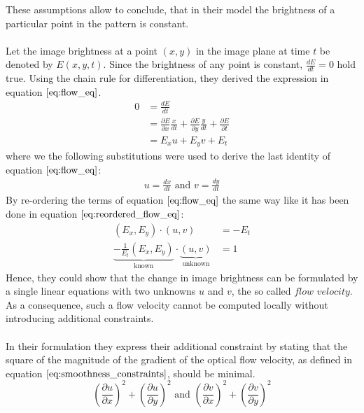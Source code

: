 These assumptions allow to conclude, that in their model the brightness of a particular point in the pattern is constant. \\ \\
Let the image brightness at a point $(x,y)$ in the image plane at time $t$ be denoted by $E(x,y,t)$. Since the brightness of any point is constant, $\frac{d E}{dt} = 0$ hold true. Using the chain rule for differentiation, they derived the expression in equation $\ref{eq:flow_eq}$.  
\begin{equation}
\begin{aligned}
0 &= \frac{d E}{dt} \\
&= \frac{\partial E}{\partial x} \frac{x}{dt} + \frac{\partial E}{\partial y} \frac{y}{dt} + \frac{\partial E}{\partial t} \\
&= E_{x} u + E_{y} v + E_{t}
\end{aligned}
\label{eq:flow_eq}	
\end{equation}
where we the following substitutions were used to derive the last identity of equation $\ref{eq:flow_eq}$:
\begin{equation}
\begin{aligned}
	u = \frac{dx}{dt} \text{ and } v = \frac{dy}{dt}
\end{aligned}
\end{equation}
By re-ordering the terms of equation $\ref{eq:flow_eq}$ the same way like it has been done in equation $\ref{eq:reordered_flow_eq}$:
\begin{equation}
\begin{aligned}
	(E_x, E_y) \cdot (u, v) &= -E_t \\
	\underbrace{-\frac{1}{E_t}\left( E_x, E_y \right)}_\text{known} \cdot \underbrace{(u, v)}_\text{unknown} &= 1
\end{aligned}
\label{eq:reordered_flow_eq}
\end{equation}
Hence, they could show that the change in image brightness can be formulated by a single linear equations with two unknowns $u$ and $v$, the so called $\textit{flow velocity}$. As a consequence, such a flow velocity cannot be computed locally without introducing additional constraints. \\ \\
In their formulation they express their additional constraint by stating that the square of the magnitude of the gradient of the optical flow velocity, as defined in equation $\ref{eq:smoothness_constraints}$, should be minimal.
\begin{equation}
	\left( \frac{\partial u}{\partial x} \right)^2 + \left( \frac{\partial u}{\partial y} \right)^2 \text{ and } \left( \frac{\partial v}{\partial x} \right)^2 + \left( \frac{\partial v}{\partial y} \right)^2
\label{eq:smoothness_constraints}
\end{equation}
